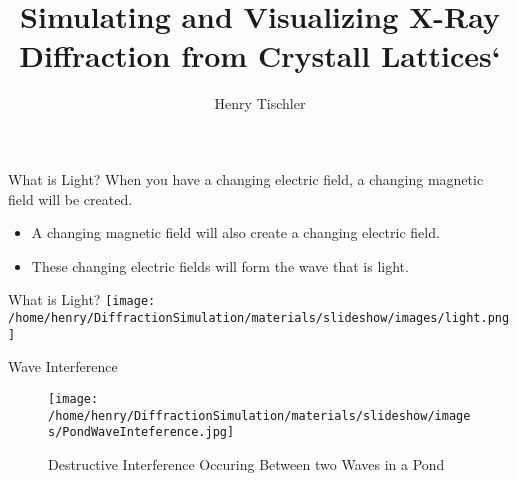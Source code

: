 \documentclass[aspectratio=169]{beamer}
\title {Simulating and Visualizing X-Ray Diffraction from Crystall Lattices`}
\author{Henry Tischler}
\institute[Institute of Computing in Research]
\begin{document}
	\titlepage


\begin {frame}{What is Light?}
	When you have a changing electric field, a changing magnetic field will be created.

	\begin{itemize}
	\item A changing magnetic field will also create a changing electric field.
	\item These changing electric fields will form the wave that is light.
	\end{itemize}		
\end{frame}

\begin {frame}{What is Light?}
	\texttt{[image: /home/henry/DiffractionSimulation/materials/slideshow/images/light.png]}
\end{frame}


\begingroup
\begin{frame}{Wave Interference}
	\begin{figure}
		\texttt{[image: /home/henry/DiffractionSimulation/materials/slideshow/images/PondWaveInteference.jpg]}

	\caption {Destructive Interference Occuring Between two Waves in a Pond}
	\end{figure}

\end{frame}
\endgroup
\end{document}
